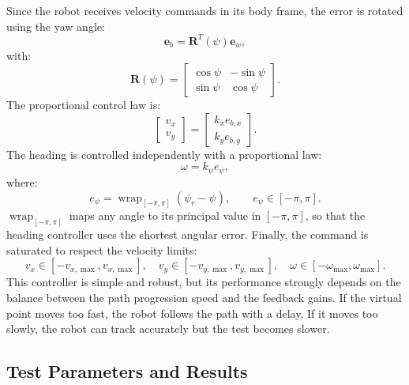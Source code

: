 Since the robot receives velocity commands in its body frame, the error is
rotated using the yaw angle:
\begin{equation}
    \mathbf{e}_{b}
    =
    \mathbf{R}^{T}(\psi)
    \mathbf{e}_{w},
\end{equation}
with:
\begin{equation}
    \mathbf{R}(\psi)
    =
    \begin{bmatrix}
        \cos\psi & -\sin\psi \\
        \sin\psi & \cos\psi
    \end{bmatrix}.
\end{equation}
The proportional control law is:
\begin{equation}
    \begin{bmatrix}
        v_x \\
        v_y
    \end{bmatrix}
    =
    \begin{bmatrix}
        k_x e_{b,x} \\
        k_y e_{b,y}
    \end{bmatrix}.
\end{equation}
The heading is controlled independently with a proportional law:
\begin{equation}
    \omega
    =
    k_{\psi}
    e_{\psi},
\end{equation}
where:
\begin{equation}
    e_{\psi}
    =
    \operatorname{wrap}_{[-\pi,\pi]}\!\left(\psi_{r}-\psi\right),
    \qquad
    e_{\psi}\in[-\pi,\pi].
\end{equation}
$\operatorname{wrap}_{[-\pi,\pi]}$ maps any angle to its principal
value in $[-\pi,\pi]$, so that the heading controller uses the shortest angular error.
\newline
Finally, the command is saturated to respect the velocity limits:
\begin{equation}
    v_x \in [-v_{x,\max}, v_{x,\max}],
    \quad
    v_y \in [-v_{y,\max}, v_{y,\max}],
    \quad
    \omega \in [-\omega_{\max}, \omega_{\max}].
\end{equation}
This controller is simple and robust, but its performance strongly depends on
the balance between the path progression speed and the feedback gains. If the
virtual point moves too fast, the robot follows the path with a delay. If it
moves too slowly, the robot can track accurately but the test becomes slower.

\newpage
\subsection{Test Parameters and Results}

